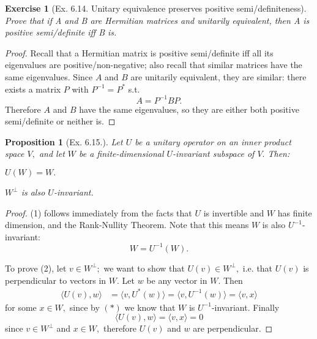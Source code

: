 \documentclass[20pt]{extarticle}
\let\oldBeginEnumerate=\enumerate
\let\oldEndEnumerate=\endenumerate
\renewenvironment{enumerate}{
\oldBeginEnumerate
  \setlength{\itemsep}{0pt}
  \setlength{\parskip}{0pt}
  \setlength{\parsep}{0pt}
}{\oldEndEnumerate}
\theoremstyle{plain}
\newtheorem{proposition}[theorem]{Proposition}
\newtheorem{exercise}[theorem]{Exercise}
\theoremstyle{definition}
\theoremstyle{remark}
\newcommand{\0}{\varnothing}
\newcommand{\<}{\langle}
\renewcommand{\>}{\rangle}
\begin{document}
\begin{exercise}[Ex. 6.14. Unitary equivalence preserves positive semi/definiteness]
Prove that if A and B are Hermitian matrices and unitarily equivalent, then A is positive semi/definite iff B is.
\end{exercise}

\begin{proof}
Recall that a Hermitian matrix is positive semi/definite iff all its eigenvalues are positive/non-negative; also recall that similar matrices have the same eigenvalues. Since $ A $ and $ B $ are unitarily equivalent, they are similar: there exists a matrix $ P $ with $ P^{-1} = P^{*} $ s.t. $$
  A = P^{-1} B P.
$$
Therefore $ A $ and $ B $ have the same eigenvalues, so they are either both positive semi/definite or neither is.
\end{proof}

\begin{proposition}[Ex. 6.15.]
Let $ U $ be a unitary operator on an inner product space $ V, $ and let $ W $ be a finite-dimensional $ U $-invariant subspace of $ V. $ Then:
\begin{enumerate}
  \item $ U(W) = W. $
  \item $ W^\perp $ is also $ U $-invariant.
\end{enumerate}
\end{proposition}

\begin{proof}
(1) follows immediately from the facts that $ U $ is invertible and $ W $ has finite dimension, and the Rank-Nullity Theorem. Note that this means $ W $ is also $ U^{-1} $-invariant: \[
W = U^{-1} (W).\tag{$ * $}
\]

To prove (2), let $ v \in W^{\perp};$ we want to show that $ U(v) \in W^\perp, $ i.e. that $ U(v) $ is perpendicular to vectors in $ W. $ Let $ w $ be any vector in $ W. $ Then \begin{align*}
\< U(v), w \> &= \< v, U^*(w) \> = \< v, U^{-1}(w) \> = \< v, x \>
\end{align*}
for some $ x \in W, $ since by $ (*) $ we know that $ W $ is $ U^{-1} $-invariant. Finally \[
  \< U(v), w \> = \< v, x \> = 0
\]
since $ v \in W^{\perp} $ and $ x \in W, $ therefore $ U(v) $ and $ w $ are perpendicular.
\end{proof}
\end{document}
